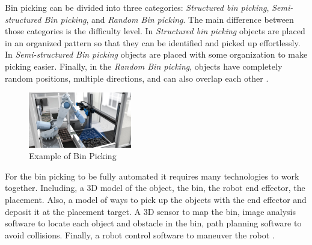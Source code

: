 Bin picking can be divided into three categories: \textit{Structured bin picking}, \textit{Semi-structured Bin picking}, and \textit{Random Bin picking}. The main difference between those categories is the difficulty level. In \textit{Structured bin picking} objects are placed in an organized pattern so that they can be identified and picked up effortlessly. In \textit{Semi-structured Bin picking} objects are placed with some organization to make picking easier. Finally, in the \textit{Random Bin picking}, objects have completely random positions, multiple directions, and can also overlap each other \cite{noauthor_future_nodate}. 

\begin{figure}[h]
 \centering
 \includegraphics[width=0.4\textwidth]{graphics/binpickingimg.png}
 \caption{Example of Bin Picking\cite{noauthor_automating_nodate}}
 \label{fig:binpickingimg}
\end{figure}

For the bin picking to be fully automated it requires many technologies to work together. Including, a 3D model of the object, the bin, the robot end effector, the placement. Also, a model of ways to pick up the objects with the end effector and deposit it at the placement target. A 3D sensor to map the bin, image analysis software to locate each object and obstacle in the bin, path planning software to avoid collisions. Finally, a robot control software to maneuver the robot \cite{truebenbach_is_2019}.





